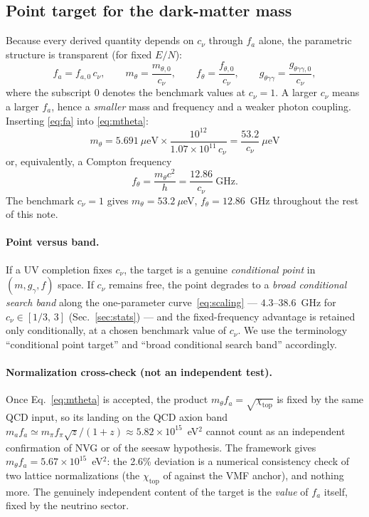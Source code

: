 \documentclass[11pt,a4paper]{article}
\begin{document}
\subsection{Point target for the dark-matter mass}

Because every derived quantity depends on $c_\nu$ through $f_a$ alone, the
parametric structure is transparent (for fixed $E/N$):
\begin{equation}
f_a = f_{a,0}\,c_\nu,\qquad
m_\theta = \frac{m_{\theta,0}}{c_\nu},\qquad
f_\theta = \frac{f_{\theta,0}}{c_\nu},\qquad
g_{\theta\gamma\gamma} = \frac{g_{\theta\gamma\gamma,0}}{c_\nu},
\label{eq:scaling}
\end{equation}
where the subscript $0$ denotes the benchmark values at $c_\nu = 1$. A larger
$c_\nu$ means a larger $f_a$, hence a \emph{smaller} mass and frequency and a
weaker photon coupling. Inserting \eqref{eq:fa} into \eqref{eq:mtheta}:
\begin{equation}
\boxed{\;m_\theta = 5.691~\mu\text{eV}\times
\frac{10^{12}}{1.07\times 10^{11}\,c_\nu}
= \frac{53.2}{c_\nu}~\mu\text{eV}\;}
\end{equation}
or, equivalently, a Compton frequency
\begin{equation}
f_\theta = \frac{m_\theta c^2}{h} = \frac{12.86}{c_\nu}~\text{GHz}.
\label{eq:freq}
\end{equation}
The benchmark $c_\nu = 1$ gives $m_\theta = 53.2~\mu$eV, $f_\theta =
12.86$~GHz throughout the rest of this note.

\paragraph{Point versus band.} If a UV completion fixes $c_\nu$, the target
is a genuine \emph{conditional point} in $(m, g_\gamma, f)$ space. If $c_\nu$
remains free, the point degrades to a \emph{broad conditional search band}
along the one-parameter curve~\eqref{eq:scaling} --- $4.3$--$38.6$~GHz for
$c_\nu \in [1/3,\,3]$ (Sec.~\ref{sec:stats}) --- and the fixed-frequency
advantage is retained only conditionally, at a chosen benchmark value of
$c_\nu$. We use the terminology ``conditional point target'' and ``broad
conditional search band'' accordingly.

\paragraph{Normalization cross-check (not an independent test).} Once
Eq.~\eqref{eq:mtheta} is accepted, the product $m_\theta f_a =
\sqrt{\chi_{\mathrm{top}}}$ is fixed by the same QCD input, so its landing on
the QCD axion band $m_a f_a \simeq m_\pi f_\pi \sqrt{z}/(1+z) \approx
5.82\times 10^{15}$~eV$^2$ \cite{QCDaxionPrecisely} cannot count as an
independent confirmation of NVG or of the seesaw hypothesis. The framework
gives $m_\theta f_a = 5.67\times 10^{15}$~eV$^2$: the 2.6\% deviation is a
numerical consistency check of two lattice normalizations (the
$\chi_{\mathrm{top}}$ of \cite{QCDaxionPrecisely} against the VMF anchor),
and nothing more. The genuinely independent content of the target is the
\emph{value} of $f_a$ itself, fixed by the neutrino sector.
\end{document}
